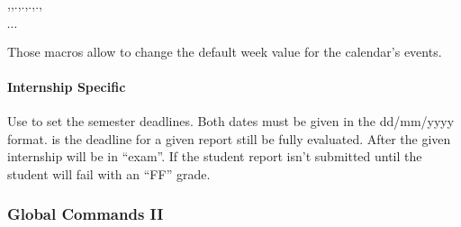 \documentclass[dctools,english,tocdepth=3,secdepth=3]{ufrgscca} %
\begin{document}
\begin{Macros}{\tcceventAweek,\tcceventBweek,.,.,.,.,\tcceventJweek}
    \begin{Syntax}%
        \ensuremath{\cdots}
    \end{Syntax}
    Those macros allow to change the default week value for the calendar's events.
\end{Macros}

\paragraph{Internship Specific}

\begin{Macros}{\intershipcommitdates}
    \begin{Syntax}%
    \end{Syntax}
    Use \Macro{\intershipcommitdates}{} to set the semester deadlines. Both dates must be given in the dd/mm/yyyy format.
     is the deadline for a given report still be fully evaluated. After  the given internship will be in “exam”. If the student report isn't submitted until  the student will fail with an “FF” grade.
\end{Macros}



\subsubsection{Global Commands II}\label{new-student}
\end{document}
